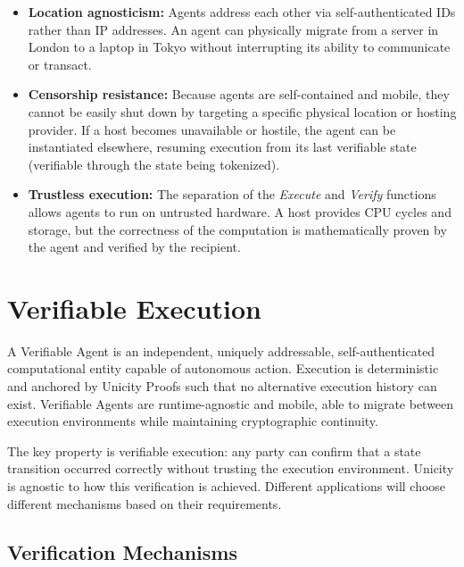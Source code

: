 \documentclass{article}
\begin{document}
\begin{itemize}
    \item \textbf{Location agnosticism:}
    Agents address each other via self-authenticated IDs rather than IP addresses. An agent can physically migrate from a server in London to a laptop in Tokyo without interrupting its ability to communicate or transact.

    \item \textbf{Censorship resistance:}
    Because agents are self-contained and mobile, they cannot be easily shut down by targeting a specific physical location or hosting provider. If a host becomes unavailable or hostile, the agent can be instantiated elsewhere, resuming execution from its last verifiable state (verifiable through the state being tokenized).

    \item \textbf{Trustless execution:}
    The separation of the \textit{Execute} and \textit{Verify} functions allows agents to run on untrusted hardware. A host provides CPU cycles and storage, but the correctness of the computation is mathematically proven by the agent and verified by the recipient.
\end{itemize}

\section{Verifiable Execution}

A Verifiable Agent is an independent, uniquely addressable, self-authenticated computational entity capable of autonomous action. Execution is deterministic and anchored by Unicity Proofs such that no alternative execution history can exist. Verifiable Agents are runtime-agnostic and mobile, able to migrate between execution environments while maintaining cryptographic continuity.

The key property is verifiable execution: any party can confirm that a state transition occurred correctly without trusting the execution environment. Unicity is agnostic to how this verification is achieved. Different applications will choose different mechanisms based on their requirements.

\subsection{Verification Mechanisms}
\end{document}
